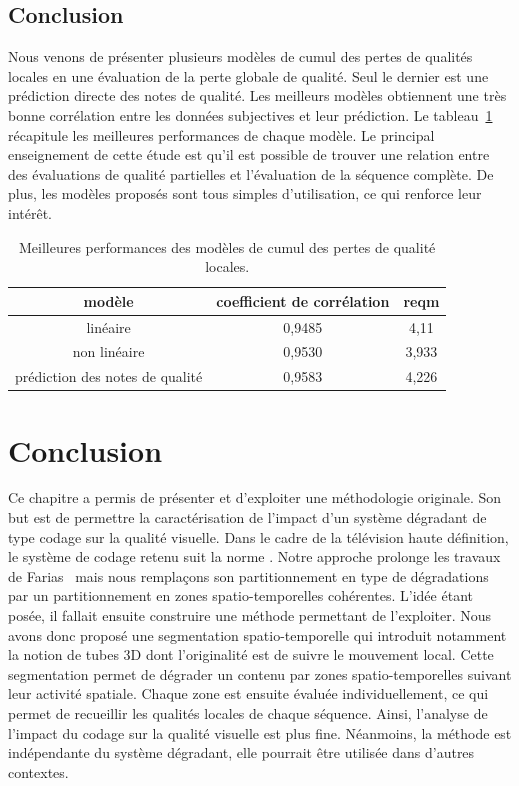 \subsection{Conclusion}
Nous venons de présenter plusieurs modèles de cumul des pertes de qualités locales en une évaluation de la perte globale de qualité. Seul le dernier est une prédiction directe des notes de qualité. Les meilleurs modèles obtiennent une très bonne corrélation entre les données subjectives et leur prédiction. Le tableau~\ref{tab:MeilleuresCombinaisons} récapitule les meilleures performances de chaque modèle. Le principal enseignement de cette étude est qu'il est possible de trouver une relation entre des évaluations de qualité partielles et l'évaluation de la séquence complète. De plus, les modèles proposés sont tous simples d'utilisation, ce qui renforce leur intérêt.

\begin{table}[htbp]
\centering
\begin{tabular}{ccc}\toprule
\textbf{modèle}							& \textbf{coefficient de corrélation}	& \textbf{reqm}	\\ \toprule
linéaire											& 0,9485												& 4,11\\ \midrule
non linéaire									& 0,9530												& 3,933\\ \midrule
prédiction des notes de qualité 	& 0,9583 												& 4,226\\ \bottomrule
\end{tabular}
\caption{Meilleures performances des modèles de cumul des pertes de qualité locales.}
\label{tab:MeilleuresCombinaisons}
\end{table}


\section{Conclusion}
Ce chapitre a permis de présenter et d'exploiter une méthodologie originale. Son but est de permettre la caractérisation de l'impact d'un système dégradant de type codage sur la qualité visuelle. Dans le cadre de la télévision haute définition, le système de codage retenu suit la norme \avc. Notre approche prolonge les travaux de Farias~\cite{farias-phd} mais nous remplaçons son partitionnement en type de dégradations par un partitionnement en zones spatio-temporelles cohérentes. L'idée étant posée, il fallait ensuite construire une méthode permettant de l'exploiter. Nous avons donc proposé une segmentation spatio-temporelle qui introduit notamment la notion de tubes 3D dont l'originalité est de suivre le mouvement local. Cette segmentation permet de dégrader un contenu par zones spatio-temporelles suivant leur activité spatiale. Chaque zone est ensuite évaluée individuellement, ce qui permet de recueillir les qualités locales de chaque séquence. Ainsi, l'analyse de l'impact du codage sur la qualité visuelle est plus fine. Néanmoins, la méthode est indépendante du système dégradant, elle pourrait être utilisée dans d'autres contextes.

